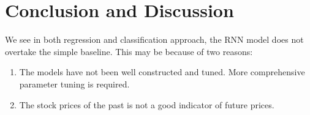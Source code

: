 \documentclass[a4paper, 11pt, usenatbib]{article}
\begin{document}
\section{Conclusion and Discussion}
We see in both regression and classification approach, the RNN model does not overtake the simple baseline. This may be because of two reasons:
\begin{enumerate}
 \item The models have not been well constructed and tuned. More comprehensive parameter tuning is required.
 \item The stock prices of the past is not a good indicator of future prices.
\end{enumerate}
\end{document}
